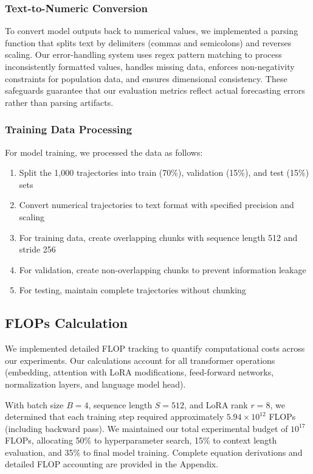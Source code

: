 \documentclass{article}
\begin{document}
\subsubsection*{Text-to-Numeric Conversion}

To convert model outputs back to numerical values, we implemented a parsing function that splits text by delimiters (commas and semicolons) and reverses scaling. Our error-handling system uses regex pattern matching to process inconsistently formatted values, handles missing data, enforces non-negativity constraints for population data, and ensures dimensional consistency. These safeguards guarantee that our evaluation metrics reflect actual forecasting errors rather than parsing artifacts.
\subsubsection*{Training Data Processing}

For model training, we processed the data as follows:
\begin{enumerate}
    \item Split the 1,000 trajectories into train (70\%), validation (15\%), and test (15\%) sets
    \item Convert numerical trajectories to text format with specified precision and scaling
    \item For training data, create overlapping chunks with sequence length 512 and stride 256
    \item For validation, create non-overlapping chunks to prevent information leakage
    \item For testing, maintain complete trajectories without chunking
\end{enumerate}

\subsection*{FLOPs Calculation}

We implemented detailed FLOP tracking to quantify computational costs across our experiments. Our calculations account for all transformer operations (embedding, attention with LoRA modifications, feed-forward networks, normalization layers, and language model head). 

With batch size $B=4$, sequence length $S=512$, and LoRA rank $r=8$, we determined that each training step required approximately $5.94 \times 10^{12}$ FLOPs (including backward pass). We maintained our total experimental budget of $10^{17}$ FLOPs, allocating 50\% to hyperparameter search, 15\% to context length evaluation, and 35\% to final model training. Complete equation derivations and detailed FLOP accounting are provided in the Appendix.
\end{document}
